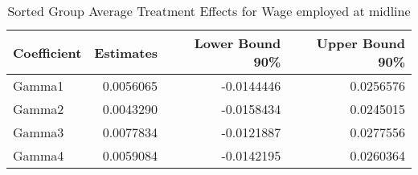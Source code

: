 \begin{table}

\caption{\label{tab:gatesRempl}Sorted Group Average Treatment Effects for Wage employed at midline}
\centering
\begin{tabular}[t]{lrrr}
\toprule
Coefficient & Estimates & Lower Bound 90\% & Upper Bound 90\%\\
\midrule
Gamma1 & 0.0056065 & -0.0144446 & 0.0256576\\
Gamma2 & 0.0043290 & -0.0158434 & 0.0245015\\
Gamma3 & 0.0077834 & -0.0121887 & 0.0277556\\
Gamma4 & 0.0059084 & -0.0142195 & 0.0260364\\
\bottomrule
\end{tabular}
\end{table}
